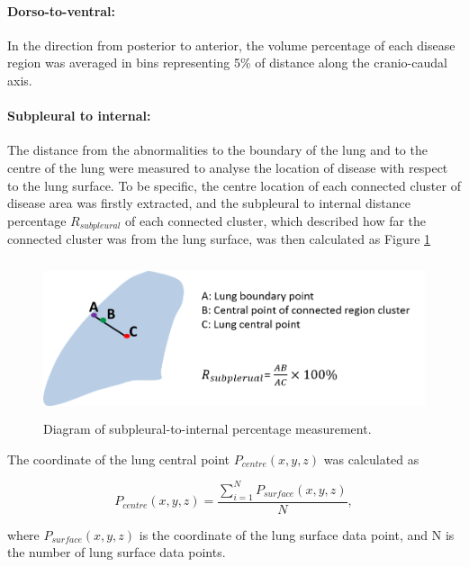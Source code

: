 \paragraph{Dorso-to-ventral:} In the direction from posterior to anterior, the volume percentage of each disease region was averaged in bins representing 5\% of distance along the cranio-caudal axis. 

\paragraph{Subpleural to internal:} The distance from the abnormalities to the boundary of the lung and to the centre of the lung were measured to analyse the location of disease with respect to the lung surface. To be specific, the centre location of each connected cluster of disease area was firstly extracted, and the subpleural to internal distance percentage $R_{subpleural}$ of each connected cluster, which described how far the connected cluster was from the lung surface, was then calculated as Figure \ref{fig:SubpleuralMethod}

\begin{figure}[H]
  \centering 
  \includegraphics[height=1.8in]{QuantitativeAnalysis/Image/SubplesrualMethod.png}
  \caption{Diagram of subpleural-to-internal percentage measurement.}
  \label{fig:SubpleuralMethod}
\end{figure}
%

The coordinate of the lung central point $P_{centre}(x,y,z)$ was calculated as

\begin{equation}
P_{centre}(x,y,z) = \frac{\sum\nolimits_{i=1}^N P_{surface}(x,y,z)}{N},
\end{equation}

\noindent where $P_{surface}(x,y,z)$ is the coordinate of the lung surface data point, and N is the number of lung surface data points.


